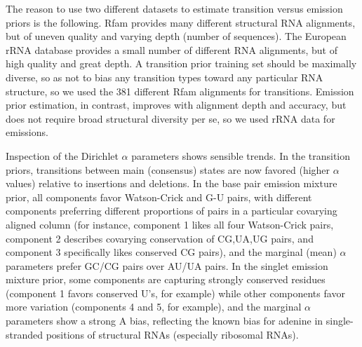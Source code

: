 \documentclass[11pt]{article}
\newif\ifdraft
\begin{document}
The reason to use two different datasets to estimate transition versus
emission priors is the following. Rfam provides many different
structural RNA alignments, but of uneven quality and varying depth
(number of sequences). The European rRNA database provides a small
number of different RNA alignments, but of high quality and great
depth.  A transition prior training set should be maximally diverse,
so as not to bias any transition types toward any particular RNA
structure, so we used the 381 different Rfam alignments for
transitions.  Emission prior estimation, in contrast, improves with
alignment depth and accuracy, but does not require broad structural
diversity per se, so we used rRNA data for emissions.

Inspection of the Dirichlet $\alpha$ parameters shows sensible
trends. In the transition priors, transitions between main (consensus)
states are now favored (higher $\alpha$ values) relative to insertions
and deletions.  In the base pair emission mixture prior, all
components favor Watson-Crick and G-U pairs, with different components
preferring different proportions of pairs in a particular covarying
aligned column (for instance, component 1 likes all four Watson-Crick
pairs, component 2 describes covarying conservation of CG,UA,UG pairs,
and component 3 specifically likes conserved CG pairs), and the
marginal (mean) $\alpha$ parameters prefer GC/CG pairs over AU/UA
pairs. In the singlet emission mixture prior, some components are
capturing strongly conserved residues (component 1 favors conserved
U's, for example) while other components favor more variation
(components 4 and 5, for example), and the marginal $\alpha$
parameters show a strong A bias, reflecting the known bias for adenine
in single-stranded positions of structural RNAs (especially ribosomal
RNAs).


\ifdraft

\fi

\ifdraft

\fi

\ifdraft

\fi
\end{document}
